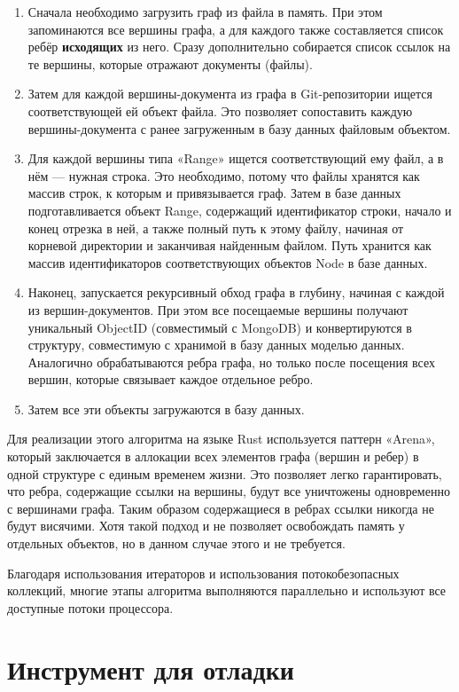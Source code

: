 \begin{enumerate}
    \item Сначала необходимо загрузить граф из файла в память. При этом запоминаются все вершины графа, а для каждого также составляется список ребёр \textbf{исходящих} из него. Сразу дополнительно собирается список ссылок на те вершины, которые отражают документы (файлы).
    \item Затем для каждой вершины-документа из графа в Git-репозитории ищется соответствующей ей объект файла. Это позволяет сопоставить каждую вершины-документа с ранее загруженным в базу данных файловым объектом.
    \item Для каждой вершины типа «Range» ищется соответствующий ему файл, а в нём — нужная строка. Это необходимо, потому что файлы хранятся как массив строк, к которым и привязывается граф. Затем в базе данных подготавливается объект Range, содержащий идентификатор строки, начало и конец отрезка в ней, а также полный путь к этому файлу, начиная от корневой директории и заканчивая найденным файлом. Путь хранится как массив идентификаторов соответствующих объектов Node в базе данных.
    \item Наконец, запускается рекурсивный обход графа в глубину, начиная с каждой из вершин-документов. При этом все посещаемые вершины получают уникальный ObjectID (совместимый с MongoDB) и конвертируются в структуру, совместимую с хранимой в базу данных моделью данных. Аналогично обрабатываются ребра графа, но только после посещения всех вершин, которые связывает каждое отдельное ребро.
    \item Затем все эти объекты загружаются в базу данных.
\end{enumerate}

Для реализации этого алгоритма на языке Rust используется паттерн «Arena», который заключается в аллокации всех элементов графа (вершин и ребер) в одной структуре с единым временем жизни. Это позволяет легко гарантировать, что ребра, содержащие ссылки на вершины, будут все уничтожены одновременно с вершинами графа. Таким образом содержащиеся в ребрах ссылки никогда не будут висячими. Хотя такой подход и не позволяет освобождать память у отдельных объектов, но в данном случае этого и не требуется.

Благодаря использования итераторов и использования потокобезопасных коллекций, многие этапы алгоритма выполняются параллельно и используют все доступные потоки процессора.

\section{Инструмент для отладки}


